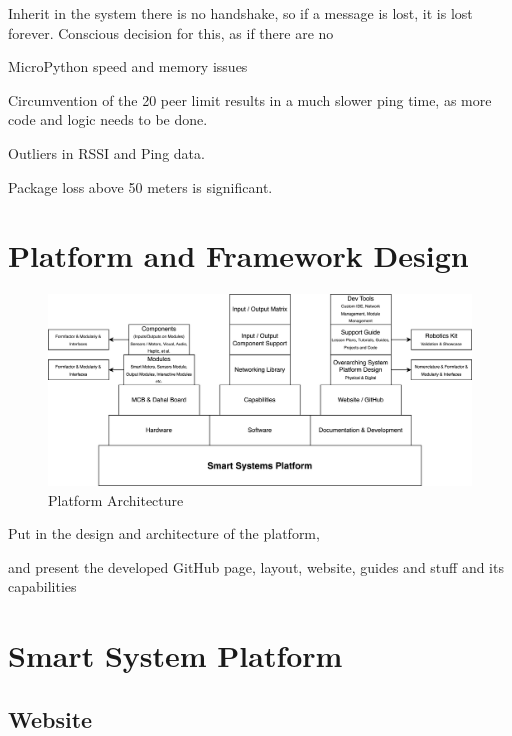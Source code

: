 
Inherit in the system there is no handshake, so if a message is lost, it is lost forever. Conscious decision for this, as if there are no 

MicroPython speed and memory issues

Circumvention of the 20 peer limit results in a much slower ping time, as more code and logic needs to be done.


Outliers in RSSI and Ping data.

Package loss above 50 meters is significant.


\section{\label{sec:res_design}Platform and Framework Design} %

\begin{figure}[H]
    \centering
    \includegraphics[width=\linewidth]{overleaf/images/Smart Systems Platform.drawio.png}
    \vspace{\ftspace}
    \caption{Platform Architecture}
    \label{fig:ssp_architecture}
\end{figure}

Put in the design and architecture of the platform,


and present the developed GitHub page, layout, website, guides and stuff and its capabilities

\section{\label{sec:res_capabilities}Smart System Platform} %

\subsection{\label{sec:res_website}Website}

